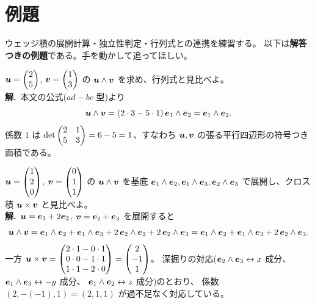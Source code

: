 \section{例題}

ウェッジ積の展開計算・独立性判定・行列式との連携を練習する。
以下は\textbf{解答つきの例題}である。手を動かして追ってほしい。

\begin{rei}[例題・基本($\R^2$ での計算)]\label{rei:wedge-r2}
$\bm{u} = \begin{pmatrix}2 \\ 5\end{pmatrix}$, $\bm{v} = \begin{pmatrix}1 \\ 3\end{pmatrix}$ の
$\bm{u} \wedge \bm{v}$ を求め、行列式と見比べよ。\\
\textbf{解.}\ 本文の公式($ad - bc$ 型)より
\[
\bm{u} \wedge \bm{v} = (2 \cdot 3 - 5 \cdot 1)\,
\bm{e}_1 \wedge \bm{e}_2 = \bm{e}_1 \wedge \bm{e}_2.
\]
係数 $1$ は $\det\begin{pmatrix}2 & 1 \\ 5 & 3\end{pmatrix} = 6 - 5 = 1$、すなわち
$\bm{u}, \bm{v}$ の張る平行四辺形の符号つき面積である。
\end{rei}

\begin{rei}[例題・基本($\R^3$ での展開とクロス積)]\label{rei:wedge-r3}
$\bm{u} = \begin{pmatrix}1 \\ 2 \\ 0\end{pmatrix}$, $\bm{v} = \begin{pmatrix}0 \\ 1 \\ 1\end{pmatrix}$ の
$\bm{u} \wedge \bm{v}$ を基底
$\bm{e}_1 \wedge \bm{e}_2, \bm{e}_1 \wedge \bm{e}_3,
\bm{e}_2 \wedge \bm{e}_3$ で展開し、クロス積
$\bm{u} \times \bm{v}$ と見比べよ。\\
\textbf{解.}\ $\bm{u} = \bm{e}_1 + 2\bm{e}_2$,
$\bm{v} = \bm{e}_2 + \bm{e}_3$ を展開すると
\[
\bm{u} \wedge \bm{v}
= \bm{e}_1 \wedge \bm{e}_2 + \bm{e}_1 \wedge \bm{e}_3
+ 2\,\bm{e}_2 \wedge \bm{e}_2 + 2\,\bm{e}_2 \wedge \bm{e}_3
= \bm{e}_1 \wedge \bm{e}_2 + \bm{e}_1 \wedge \bm{e}_3
+ 2\,\bm{e}_2 \wedge \bm{e}_3.
\]
一方 $\bm{u} \times \bm{v} = \begin{pmatrix}2 \cdot 1 - 0 \cdot 1 \\
0 \cdot 0 - 1 \cdot 1 \\ 1 \cdot 1 - 2 \cdot 0\end{pmatrix} = \begin{pmatrix}2 \\ -1 \\ 1\end{pmatrix}$。
深掘りの対応($\bm{e}_2 \wedge \bm{e}_3 \leftrightarrow x$ 成分、
$\bm{e}_1 \wedge \bm{e}_3 \leftrightarrow -y$ 成分、
$\bm{e}_1 \wedge \bm{e}_2 \leftrightarrow z$ 成分)のとおり、
係数 $(2, -(-1), 1) = (2, 1, 1)$ が過不足なく対応している。
\end{rei}

